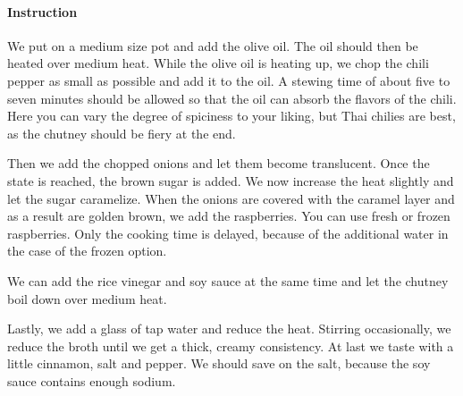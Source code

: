 \paragraph{Instruction} We put on a medium size pot and add the olive oil. The oil should then be heated over medium heat. While the olive oil is heating up, we chop the chili pepper as small as possible and add it to the oil. A stewing time of about five to seven minutes should be allowed so that the oil can absorb the flavors of the chili. Here you can vary the degree of spiciness to your liking, but Thai chilies are best, as the chutney should be fiery at the end.

Then we add the chopped onions and let them become translucent. Once the state is reached, the brown sugar is added. We now increase the heat slightly and let the sugar caramelize. When the onions are covered with the caramel layer and as a result are golden brown, we add the raspberries. You can use fresh or frozen raspberries. Only the cooking time is delayed, because of the additional water in the case of the frozen option.

We can add the rice vinegar and soy sauce at the same time and let the chutney boil down over medium heat.

Lastly, we add a glass of tap water and reduce the heat. Stirring occasionally, we reduce the broth until we get a thick, creamy consistency. At last we taste with a little cinnamon, salt and pepper. We should save on the salt, because the soy sauce contains enough sodium.
